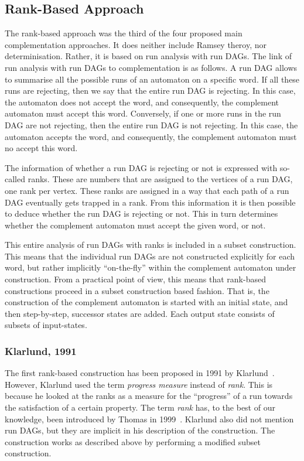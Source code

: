 \subsection{Rank-Based Approach}
\label{2_rank-based}
The rank-based approach was the third of the four proposed main complementation approaches. It does neither include Ramsey theroy, nor determinisation. Rather, it is based on run analysis with run DAGs. The link of run analysis with run DAGs to complementation is as follows. A run DAG allows to summarise all the possible runs of an automaton on a specific word. If all these runs are rejecting, then we say that the entire run DAG is rejecting. In this case, the automaton does not accept the word, and consequently, the complement automaton must accept this word. Conversely, if one or more runs in the run DAG are not rejecting, then the entire run DAG is not rejecting. In this case, the automaton accepts the word, and consequently, the complement automaton must no accept this word.

The information of whether a run DAG is rejecting or not is expressed with so-called ranks. These are numbers that are assigned to the vertices of a run DAG, one rank per vertex. These ranks are assigned in a way that each path of a run DAG eventually gets trapped in a rank. From this information it is then possible to deduce whether the run DAG is rejecting or not. This in turn determines whether the complement automaton must accept the given word, or not.

This entire analysis of run DAGs with ranks is included in a subset construction. This means that the individual run DAGs are not constructed explicitly for each word, but rather implicitly ``on-the-fly'' within the complement automaton under construction. From a practical point of view, this means that rank-based constructions proceed in a subset construction based fashion. That is, the construction of the complement automaton is started with an initial state, and then step-by-step, successor states are added. Each output state consists of subsets of input-states.

\subsubsection{Klarlund, 1991}
The first rank-based construction has been proposed in 1991 by Klarlund~\cite{1991_klarlund}. However, Klarlund used the term \textit{progress measure} instead of \textit{rank}. This is because he looked at the ranks as a measure for the ``progress'' of a run towards the satisfaction of a certain property. The term \textit{rank} has, to the best of our knowledge, been introduced by Thomas in 1999~\cite{1999_thomas}. Klarlund also did not mention run DAGs, but they are implicit in his description of the construction. The construction works as described above by performing a modified subset construction. 

